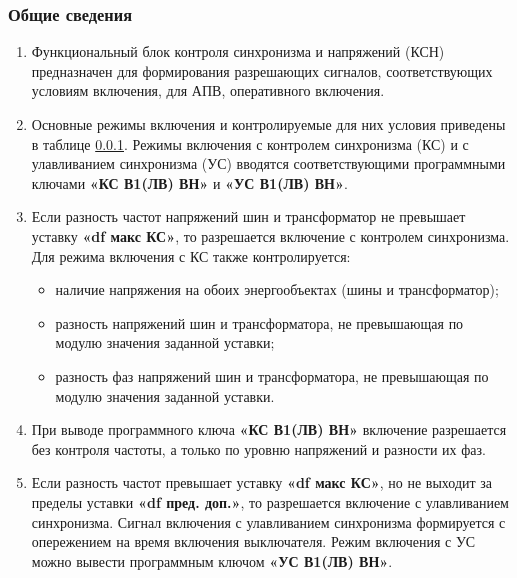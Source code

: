 \color{black}

\subsubsection{Общие сведения}

\begin{enumerate}[label=\arabic{section}.\arabic{subsection}.\arabic{subsubsection}.\arabic*,  align=left, labelsep=4pt, leftmargin=0pt, itemindent=57pt]

\item
Функциональный блок контроля синхронизма и напряжений (КСН) предназначен для
формирования разрешающих сигналов, соответствующих условиям включения, для АПВ, оперативного
включения.

\item
Основные режимы включения и контролируемые для них условия приведены в таблице \ref{}.
Режимы включения с контролем синхронизма (КС) и с улавливанием синхронизма
(УС) вводятся соответствующими программными ключами \textbf{«КС В1(ЛВ) ВН»} и \textbf{«УС В1(ЛВ) ВН»}.

\item
Если разность частот напряжений шин и трансформатор не превышает уставку \textbf{«df макс КС»},
то разрешается включение с контролем синхронизма. Для режима включения с КС также контролируется:
\begin{itemize}
\item наличие напряжения на обоих энергообъектах (шины и трансформатор);
\item разность напряжений шин и трансформатора, не превышающая по модулю значения заданной уставки;
\item разность фаз напряжений шин и трансформатора, не превышающая по модулю значения заданной уставки.
\end{itemize}

\item
При выводе программного ключа \textbf{«КС В1(ЛВ) ВН»} включение разрешается без контроля частоты,
а только по уровню напряжений и разности их фаз.

\item
Если разность частот превышает уставку \textbf{«df макс КС»}, но не выходит за пределы уставки \textbf{«df
пред. доп.»}, то разрешается включение с улавливанием синхронизма. Сигнал включения с
улавливанием синхронизма формируется с опережением на время включения выключателя. Режим
включения с УС можно вывести программным ключом \textbf{«УС В1(ЛВ) ВН»}.


\end{enumerate}
